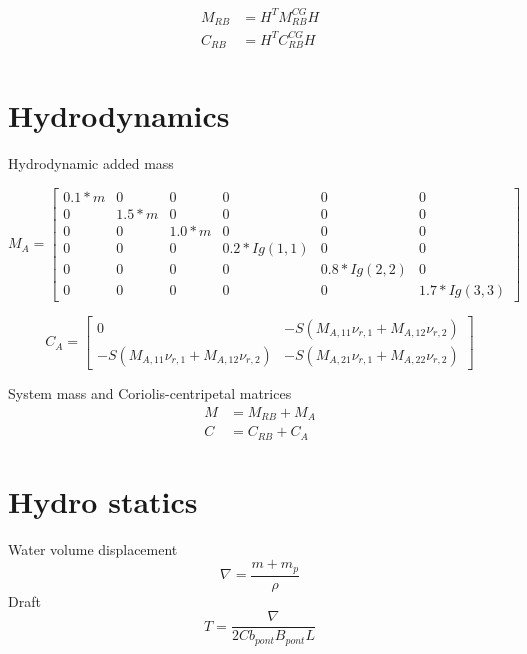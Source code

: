 \documentclass[12pt,a4]{article}
\begin{document}
\begin{align}
	M_{RB} & = H^T M_{RB}^{CG} H \\
	C_{RB} & = H^T C_{RB}^{CG} H \\
\end{align}

\section{Hydrodynamics}
Hydrodynamic added mass

\begin{equation}
	M_A =
	\begin{bmatrix}
		0.1 * m & 0       & 0       & 0             & 0             & 0             \\
		0       & 1.5 * m & 0       & 0             & 0             & 0             \\
		0       & 0       & 1.0 * m & 0             & 0             & 0             \\
		0       & 0       & 0       & 0.2 * Ig(1,1) & 0             & 0             \\
		0       & 0       & 0       & 0             & 0.8 * Ig(2,2) & 0             \\
		0       & 0       & 0       & 0             & 0             & 1.7 * Ig(3,3)
	\end{bmatrix}
\end{equation}


\begin{equation}
	C_A = \begin{bmatrix}
		0                                         & -S(M_{A,11}\nu_{r,1} + M_{A,12}\nu_{r,2}) \\
		-S(M_{A,11}\nu_{r,1} + M_{A,12}\nu_{r,2}) & -S(M_{A,21}\nu_{r,1} + M_{A,22}\nu_{r,2})
	\end{bmatrix}
\end{equation}

System mass and Coriolis-centripetal matrices
\begin{align}
	M & = M_{RB} + M_A \\
	C & = C_{RB} + C_A
\end{align}


\section{Hydro statics}
Water volume displacement
\begin{equation}
	\nabla = \frac{m+m_p}{\rho}
\end{equation}
Draft
\begin{equation}
	T = \frac{\nabla}{2 Cb_{pont} B_{pont} L}     %
\end{equation}
\end{document}
